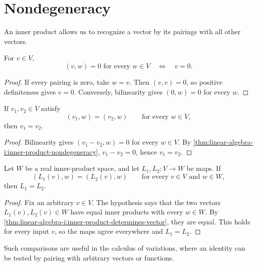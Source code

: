 \section{Nondegeneracy}
\label{sec:linear-algebra-i:inner-product-nondegeneracy}

An inner product allows us to recognize a vector by its pairings with all
other vectors.

\begin{proposition}
  \label{thm:linear-algebra-i:inner-product-nondegeneracy}
  For \(v\in V\),
  \[
    (v,w)=0\text{ for every }w\in V
    \quad\Longleftrightarrow\quad v=0.
  \]
\end{proposition}

\begin{proof}
  If every pairing is zero, take \(w=v\). Then \((v,v)=0\), so
  positive definiteness gives \(v=0\). Conversely, bilinearity gives
  \((0,w)=0\) for every \(w\).
\end{proof}

\begin{proposition}
  \label{thm:linear-algebra-i:inner-product-determines-vector}
  If \(v_1,v_2\in V\) satisfy
  \[
    (v_1,w)=(v_2,w)\qquad\text{for every }w\in V,
  \]
  then \(v_1=v_2\).
\end{proposition}

\begin{proof}
  Bilinearity gives \((v_1-v_2,w)=0\) for every \(w\in V\).
  By \autoref{thm:linear-algebra-i:inner-product-nondegeneracy},
  \(v_1-v_2=0\), hence \(v_1=v_2\).
\end{proof}

\begin{corollary}
  \label{thm:linear-algebra-i:maps-determined-by-pairings}
  Let \(W\) be a real inner-product space, and let \(L_1,L_2:V\to W\)
  be maps. If
  \[
    (L_1(v),w)=(L_2(v),w)\qquad
    \text{for every }v\in V\text{ and }w\in W,
  \]
  then \(L_1=L_2\).
\end{corollary}
\begin{pendingreview}
\begin{proof}
  Fix an arbitrary \(v\in V\). The hypothesis says that the two vectors
  \(L_1(v),L_2(v)\in W\) have equal inner products with every
  \(w\in W\). By
  \autoref{thm:linear-algebra-i:inner-product-determines-vector}, they
  are equal. This holds for every input \(v\), so the maps agree
  everywhere and \(L_1=L_2\).
\end{proof}
\end{pendingreview}

Such comparisons are useful in the calculus of variations, where an
identity can be tested by pairing with arbitrary vectors or functions.
